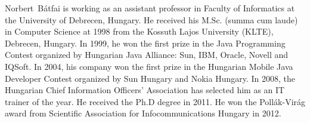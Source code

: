 \begin{IEEEbiography}{Norbert~B\'atfai}
is working as an assistant professor in Faculty of Informatics at the University of Debrecen, Hungary. He received his M.Sc. (summa cum laude) in Computer Science at 1998 from the Kossuth Lajos University (KLTE), Debrecen, Hungary. In 1999, he won the first prize in the Java Programming Contest organized by Hungarian Java Alliance: Sun, IBM, Oracle, Novell and IQSoft. In 2004, his company won the first prize in the Hungarian Mobile Java Developer Contest organized by Sun Hungary and Nokia Hungary. In 2008, the Hungarian Chief Information Officers' Association has selected him as an IT trainer of the year. He received the Ph.D degree in 2011. He won the Poll\'ak-Vir\'ag award from Scientific Association for Infocommunications Hungary in 2012.
\end{IEEEbiography}
